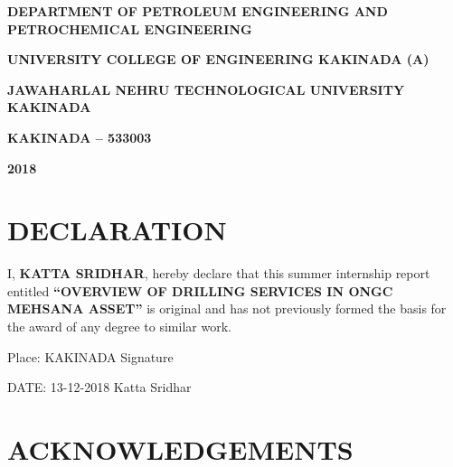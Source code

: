 \documentclass[11pt,a4paper]{report}
\begin{document}
\begin{titlepage}
\begin{center}
\vspace{1em}

\doublespacing

\large \textbf{DEPARTMENT OF PETROLEUM ENGINEERING AND \\
PETROCHEMICAL ENGINEERING}

\large \textbf{UNIVERSITY COLLEGE OF ENGINEERING KAKINADA (A)}

\large \textbf{JAWAHARLAL NEHRU TECHNOLOGICAL UNIVERSITY KAKINADA}

\large \textbf{KAKINADA – 533003}

\large \textbf{2018}

\end{center}
\end{titlepage}

\newpage

\section*{\centering DECLARATION}


\vspace{4em}

\doublespacing


I, \textbf{KATTA SRIDHAR}, hereby declare that this summer internship report entitled \textbf{“OVERVIEW OF DRILLING SERVICES IN ONGC MEHSANA ASSET”} is original and has not previously 
formed the basis for the award of any degree to similar work.


\vspace{5em}

\noindent Place: KAKINADA  \hfill Signature     \hspace{0.02\textwidth}

\vspace{1em}

\noindent DATE: 13-12-2018  \hfill Katta Sridhar




\newpage


\section*{\centering ACKNOWLEDGEMENTS}

\doublespacing


\vspace{1em}
\end{document}
